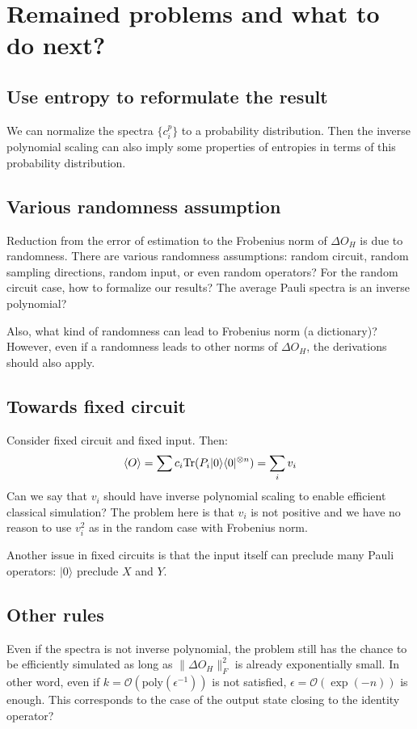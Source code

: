 \documentclass[showpacs,amsmath,amssymb,twocolumn,superscriptaddress,notitlepage,preprintnumbers,aps,pra,10pt,floatfix]{revtex4-2}
\begin{document}
\section{Remained problems and what to do next?}

\subsection{Use entropy to reformulate the result}
We can normalize the spectra $\{c_i^p\}$ to a probability distribution. Then the inverse polynomial scaling can also imply some properties of entropies in terms of this probability distribution.

\subsection{Various randomness assumption}
Reduction from the error of estimation to the Frobenius norm of $\Delta O_H$ is due to randomness. There are various randomness assumptions: random circuit, random sampling directions, random input, or even random operators? For the random circuit case, how to formalize our results? The average Pauli spectra is an inverse polynomial?

Also, what kind of randomness can lead to Frobenius norm (a dictionary)? However, even if a randomness leads to other norms of $\Delta O_H$, the derivations should also apply.

\subsection{Towards fixed circuit}
Consider fixed circuit and fixed input. Then:
\begin{eqnarray}
\langle O\rangle =\sum c_i \mathrm{Tr}(P_i|0\rangle\langle 0|^{\otimes n})=\sum_i v_i
\end{eqnarray}
Can we say that $v_i$ should have inverse polynomial scaling to enable efficient classical simulation? The problem here is that $v_i$ is not positive and we have no reason to use $v_i^2$ as in the random case with Frobenius norm. 

Another issue in fixed circuits is that the input itself can preclude many Pauli operators: $|0\rangle$ preclude $X$ and $Y$.

\subsection{Other rules}
Even if the spectra is not inverse polynomial, the problem still has the chance to be efficiently simulated as long as $\|\Delta O_H\|_F^2$ is already exponentially small. In other word, even if $k=\mathcal{O}(\text{poly}(\epsilon^{-1}))$ is not satisfied, $\epsilon=\mathcal{O}(\exp(-n))$ is enough. This corresponds to the case of the output state closing to the identity operator?
\end{document}
